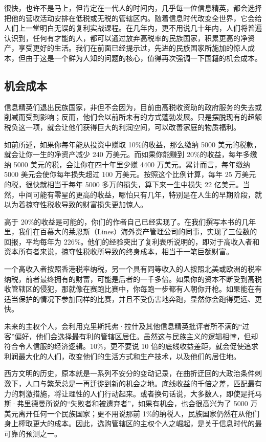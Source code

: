 很快，也许不是马上，但肯定在一代人的时间内，几乎每一位信息精英，都会选择把他的营收活动安排在低税或无税的管辖区内。随着信息时代改变全世界，它会给人们上一堂明白无误的复利实战课程。在几年内，更不用说几十年内，人们将普遍认识到，任何有才能的人，都可以通过放弃高税率的民族国家，积累更高的净资产，享受更好的生活。我们在前面已经提示过，先进的民族国家所施加的惊人成本，但由于这是一个鲜为人知的问题的核心，值得再次强调一下国籍的机会成本。

\subsection{机会成本}
信息精英们退出民族国家，非但不会因为，目前由高税收资助的政府服务的失去或削减而受到影响；反而，他们会以前所未有的方式蓬勃发展。只是摆脱现有的超额税负这一项，就会让他们获得巨大的利润空间，可以改善家庭的物质福利。

如前所述，如果你每年能从投资中赚取 10\%的收益，那么缴纳 5000 美元的税款，就会让你一生的净资产减少 240 万美元。而如果你能赚到 20\%的收益，每年多缴纳 5000 美元的税，会让你在四十年里少赚 4400 万美元。累计而言，每年缴纳5000 美元会使你每年损失超过 100 万美元。按照这个比例计算，每年 25 万美元的税，很快就相当于每年 5000 多万的损失，算下来一生中损失 22 亿美元。当然，中间可能有零星的更高的收益，哪怕只有几年，特别是在人生的早期阶段，就以为着掠夺性税收导致的财富损失更加惊人。

高于 20\%的收益是可能的，你们的作者自己已经实现了。在我们撰写本书的几年里，我们在百慕大的莱恩斯（Lines）海外资产管理公司的同事，实现了三位数的回报，平均每年为 226\%。他们的经验突出了复利表所说明的，即对于高收入者和资本所有者来说，掠夺性税收所导致的终身成本，相当于一笔巨额财富。

一个高收入者按照香港税率纳税，另一个具有同等收入的人按照北美或欧洲的税率纳税，前者最终拥有的财富，可能是后者的一千多倍。如果你的资本不断受到高税收管辖区的侵犯，那就像在赛跑比赛中，你每跑一步都有人朝你开枪。如果能在有适当保护的情况下参加同样的比赛，并且不受伤害地奔跑，显然你会跑得更远、更快。

未来的主权个人，会利用克里斯托弗·拉什及其他信息精英批评者所不满的“过客”偏好，他们会选择最有利的管辖区居住。虽然这与民族主义的逻辑相悖，但却符合令人信服的经济逻辑。10\%，更不要说 10 倍的底线收益差距，就会促使追求利润最大化的人们，改变他们的生活方式和生产技术，以及他们的居住地。

西方文明的历史，原本就是一系列不安分的变动记录，在曲折迂回的大政治条件刺激下，人口与繁荣总是一再迁徙到新的机会之地。底线收益的千倍之差，匹配最有力的刺激措施，将让理性的人们行动起来。或者换句话说，大多数人，即使是托马斯·弗里德曼所说的“失败者和被遗弃者”，如果有机会，也会很高兴为了 5000 万美元离开任何一个民族国家；更不用说那前 1\%的纳税人，民族国家仍然在从他们身上榨取更大的成本。因此，选购管辖区的主权个人之崛起，是关于信息时代的最可靠的预测之一。

